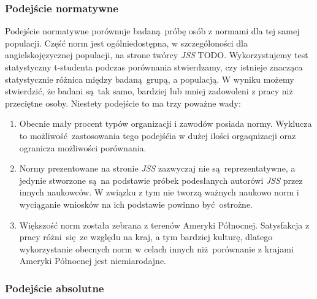 \subsubsection{Podejście normatywne}
Podejście normatywne porównuje badaną próbę osób z normami dla tej samej populacji. Część norm jest ogólniedostępna, w szczególoności dla angielskojęzycznej populacji, na strone twórcy \emph{JSS} TODO. Wykorzystujemy test statystyczny t-studenta podczas porównania stwierdzamy, czy istnieje znacząca statystycznie różnica między badaną grupą, a populacją. W wyniku możemy stwierdzić, że badani są tak samo, bardziej lub mniej zadowoleni z pracy niż przeciętne osoby. Niestety podejście to
ma trzy poważne wady:
\begin{enumerate}
\item Obecnie mały procent typów organizacji i zawodów posiada normy. Wyklucza to możliwość zastosowania tego podejśćia w dużej ilości orgaqnizacji oraz ogranicza możliwości porównania.
\item Normy prezentowane na stronie \emph{JSS} zazwyczaj nie są reprezentatywne, a jedynie stworzone są na podstawie próbek podesłanych autorówi \emph{JSS} przez innych naukowców. W związku z tym nie tworzą ważnych naukowo norm i wyciąganie wniosków na ich podstawie powinno być ostrożne.
\item Większość norm została zebrana z terenów Ameryki Północnej. Satysfakcja z pracy różni się ze względu na kraj, a tym bardziej kulturę, dlatego wykorzystanie obecnych norm w celach innych niż porównanie z krajami Ameryki Północnej jest niemiarodajne.
\end{enumerate}
 
\subsubsection{Podejście absolutne}

